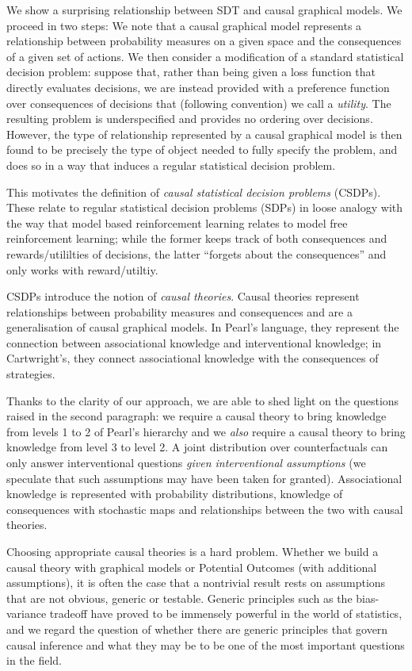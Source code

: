 We show a surprising relationship between SDT and causal graphical models. We proceed in two steps: We note that a causal graphical model represents a relationship between probability measures on a given space and the consequences of a given set of actions. We then consider a modification of a standard statistical decision problem: suppose that, rather than being given a loss function that directly evaluates decisions, we are instead provided with a preference function over consequences of decisions that (following convention) we call a \emph{utility}. The resulting problem is underspecified and provides no ordering over decisions. However, the type of relationship represented by a causal graphical model is then found to be precisely the type of object needed to fully specify the problem, and does so in a way that induces a regular statistical decision problem.

This motivates the definition of \emph{causal statistical decision problems} (CSDPs). These relate to regular statistical decision problems (SDPs) in loose analogy with the way that model based reinforcement learning relates to model free reinforcement learning; while the former keeps track of both consequences and rewards/utililties of decisions, the latter ``forgets about the consequences'' and only works with reward/utiltiy.

CSDPs introduce the notion of \emph{causal theories}. Causal theories represent relationships between probability measures and consequences and are a generalisation of causal graphical models. In Pearl's language, they represent the connection between associational knowledge and interventional knowledge; in Cartwright's, they connect associational knowledge with the consequences of strategies. 

Thanks to the clarity of our approach, we are able to shed light on the questions raised in the second paragraph: we require a causal theory to bring knowledge from levels 1 to 2 of Pearl's hierarchy and we \emph{also} require a causal theory to bring knowledge from level 3 to level 2. A joint distribution over counterfactuals can only answer interventional questions \emph{given interventional assumptions} (we speculate that such assumptions may have been taken for granted). Associational knowledge is represented with probability distributions, knowledge of consequences with stochastic maps and relationships between the two with causal theories.

Choosing appropriate causal theories is a hard problem. Whether we build a causal theory with graphical models or Potential Outcomes (with additional assumptions), it is often the case that a nontrivial result rests on assumptions that are not obvious, generic or testable. Generic principles such as the bias-variance tradeoff have proved to be immensely powerful in the world of statistics, and we regard the question of whether there are generic principles that govern causal inference and what they may be to be one of the most important questions in the field.

